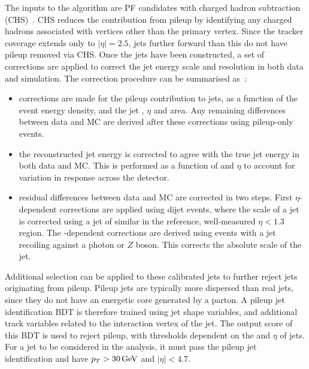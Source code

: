 The inputs to the \akt algorithm are PF candidates with charged hadron subtraction (CHS)~\cite{JEC}. 
CHS reduces the contribution from pileup by identifying any charged hadrons associated with vertices other than the primary vertex.
Since the tracker coverage extends only to $|\eta|=2.5$, 
jets further forward than this do not have pileup removed via CHS.
Once the jets have been constructed, a set of corrections are applied to correct the jet energy scale and resolution in both data and simulation.
The correction procedure can be summarised as~\cite{JEC}:
\begin{itemize}
  \item corrections are made for the pileup contribution to jets, as a function of the event energy density, 
        and the jet \pt, $\eta$ and area.
        Any remaining differences between data and MC are derived after these corrections using pileup-only events.
  \item the reconstructed jet energy is corrected to agree with the true jet energy in both data and MC.
        This is performed as a function of \pt and $\eta$ to account for variation in response across the detector.
  \item residual differences between data and MC are corrected in two steps.
        First $\eta$-dependent corrections are applied using dijet events, 
        where the scale of a jet is corrected using a jet of similar \pt in the reference, well-measured $\eta < 1.3$ region.
        The \pt-dependent corrections are derived using events with a jet recoiling against a photon or $Z$ boson.
        This corrects the absolute scale of the jet.
\end{itemize}

Additional selection can be applied to these calibrated jets to further reject jets originating from pileup.
Pileup jets are typically more dispersed than real jets, since they do not have an energetic core generated by a parton.
A pileup jet identification BDT is therefore trained using jet shape variables, 
and additional track variables related to the interaction vertex of the jet.
The output score of this BDT is used to reject pileup, with thresholds dependent on the \pt and $\eta$ of jets.
For a jet to be considered in the analysis, it must pass the pileup jet identification and have $p_T > \SI{30}{GeV}$ and $|\eta| < 4.7$.

